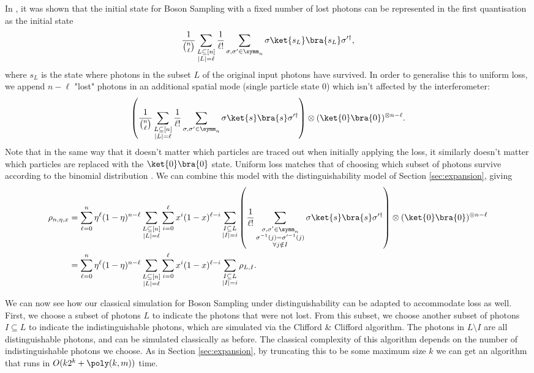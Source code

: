 In \cite{oszmaniec2018,moylett2018}, it was shown that the initial state for Boson Sampling with a fixed number of lost photons can be represented in the first quantisation as the initial state
\begin{equation}
\frac{1}{\binom{n}{\ell}}\sum_{\substack{L\subseteq[n]\\|L|=\ell}}\frac{1}{\ell!}\sum_{\sigma,\sigma'\in\symm_n}\sigma\ket{s_L}\bra{s_L}\sigma'^\dagger,
\end{equation}
where $s_L$ is the state where photons in the subset $L$ of the original input photons have survived. 
In order to generalise this to uniform loss, we append $n-\ell$ "lost" photons in an additional spatial mode (single particle state $0$) which isn't affected by the interferometer:
\begin{align}
\left(\frac{1}{\binom{n}{\ell}}\sum_{\substack{L\subseteq[n]\\|L|=\ell}}\frac{1}{\ell!}\sum_{\sigma,\sigma'\in\symm_n}\sigma\ket{s}\bra{s}\sigma'^\dagger\right)\otimes(\ket{0}\bra{0})^{\otimes n-\ell}.
\end{align}
Note that in the same way that it doesn't matter which particles are traced out when initially applying the loss, it similarly doesn't matter which particles are replaced with the $\ket{0}\bra{0}$ state. 
Uniform loss matches that of choosing which subset of photons survive according to the binomial distribution \cite{oszmaniec2018,renema2018loss}. 
We can combine this model with the distinguishability model of Section \ref{sec:expansion}, giving
\begin{align}
\rho_{n,\eta,x}&=\sum_{\ell=0}^n\eta^\ell(1-\eta)^{n-\ell}\sum_{\substack{L\subseteq[n]\\|L|=\ell}}\sum_{i=0}^\ell x^i(1-x)^{\ell-i}\sum_{\substack{I\subseteq L\\|I|=i}}\left(\frac{1}{\ell!}\sum_{\substack{\sigma,\sigma'\in\symm_n\\\sigma^{-1}(j)=\sigma'^{-1}(j)\\\forall j \notin I}}\sigma\ket{s}\bra{s}\sigma'^\dagger\right)\otimes(\ket{0}\bra{0})^{\otimes n-\ell}\\
&=\sum_{\ell=0}^n\eta^\ell(1-\eta)^{n-\ell}\sum_{\substack{L\subseteq[n]\\|L|=\ell}}\sum_{i=0}^\ell x^i(1-x)^{\ell-i}\sum_{\substack{I\subseteq L\\|I|=i}}\rho_{L,I}.
\end{align}

We can now see how our classical simulation for Boson Sampling under distinguishability can be adapted to accommodate loss as well. 
First, we choose a subset of photons $L$ to indicate the photons that were not lost. 
From this subset, we choose another subset of photons $I\subseteq L$ to indicate the indistinguishable photons, which are simulated via the Clifford \& Clifford algorithm. 
The photons in $L\setminus I$ are all distinguishable photons, and can be simulated classically as before. 
The classical complexity of this algorithm depends on the number of indistinguishable photons we choose. 
As in Section \ref{sec:expansion}, by truncating this to be some maximum size $k$ we can get an algorithm that runs in $O(k2^k+\poly(k,m))$ time.

